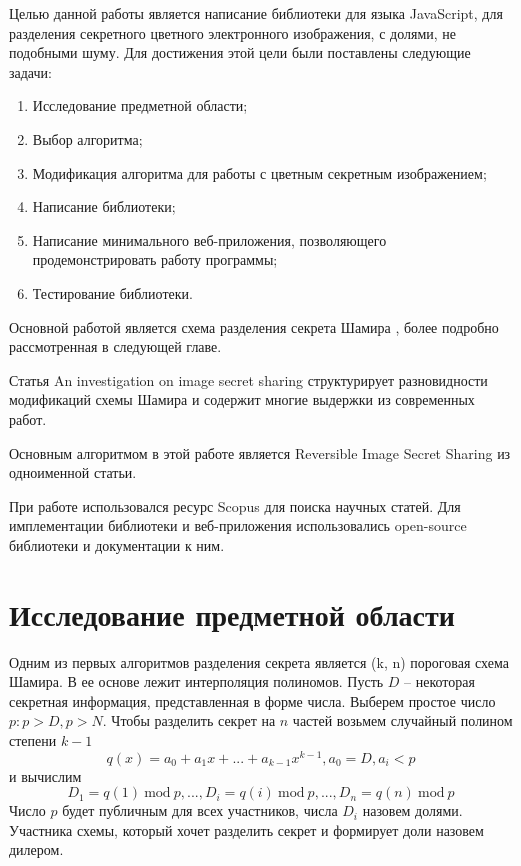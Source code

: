\documentclass[a4paper,article,14pt]{extarticle}
\newcommand{\Mod}[1]{\ \mathrm{mod}\ #1}
\begin{document}
Целью данной работы является написание библиотеки для языка JavaScript, для разделения секретного цветного электронного изображения,
с долями, не подобными шуму. Для достижения этой цели были поставлены следующие задачи:
\begin{enumerate}
    \item Исследование предметной области;
    \item Выбор алгоритма;
    \item Модификация алгоритма для работы с цветным секретным изображением;
    \item Написание библиотеки;
    \item Написание минимального веб-приложения, позволяющего продемонстрировать работу программы;
    \item Тестирование библиотеки.
\end{enumerate}

\newpage
{}
Основной работой является схема разделения секрета Шамира \cite{shamir}, более подробно рассмотренная в следующей главе.

Статья \flqq An investigation on image secret sharing \frqq \cite{review} структурирует разновидности модификаций схемы Шамира и содержит многие выдержки из современных работ.

Основным алгоритмом в этой работе является Reversible Image Secret Sharing \cite{RISS} из одноименной статьи. 

При работе использовался ресурс Scopus \cite{scopus} для поиска научных статей. 
    Для имплементации библиотеки и веб-приложения использовались open-source библиотеки и документации
\cite{react} \cite{image-js} \cite{Big.js} к ним.

\newpage
\section{Исследование предметной области}
Одним из первых алгоритмов разделения секрета является (k, n) пороговая схема Шамира\cite{shamir}. В ее основе лежит интерполяция 
полиномов. Пусть $D$ -- некоторая секретная информация, представленная в форме числа. Выберем простое число $p: p > D, p > N$.
Чтобы разделить секрет на $n$ частей возьмем случайный полином степени $k-1$ 
\begin{equation}
    q(x) = a_0 + a_1 x +...+ a_{k-1} x^{k-1},
    a_0=D, a_i<p
\end{equation}
и вычислим
\begin{equation}
    D_1=q(1)\Mod{p}, ..., D_i=q(i)\Mod{p}, ..., D_n=q(n)\Mod{p}
\end{equation}
Число $p$ будет публичным для всех участников, числа $D_i$ назовем долями. Участника схемы, который хочет разделить секрет и 
формирует доли назовем дилером.
\end{document}
